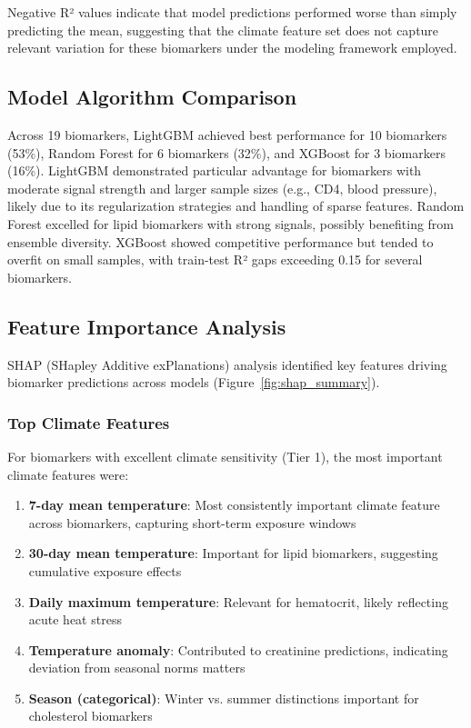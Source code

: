 Negative R² values indicate that model predictions performed worse than simply predicting the mean, suggesting that the climate feature set does not capture relevant variation for these biomarkers under the modeling framework employed.

\subsection{Model Algorithm Comparison}

Across 19 biomarkers, LightGBM achieved best performance for 10 biomarkers (53\%), Random Forest for 6 biomarkers (32\%), and XGBoost for 3 biomarkers (16\%). LightGBM demonstrated particular advantage for biomarkers with moderate signal strength and larger sample sizes (e.g., CD4, blood pressure), likely due to its regularization strategies and handling of sparse features. Random Forest excelled for lipid biomarkers with strong signals, possibly benefiting from ensemble diversity. XGBoost showed competitive performance but tended to overfit on small samples, with train-test R² gaps exceeding 0.15 for several biomarkers.

\subsection{Feature Importance Analysis}

SHAP (SHapley Additive exPlanations) analysis identified key features driving biomarker predictions across models (Figure~\ref{fig:shap_summary}).

\subsubsection{Top Climate Features}

For biomarkers with excellent climate sensitivity (Tier 1), the most important climate features were:
\begin{enumerate}
    \item \textbf{7-day mean temperature}: Most consistently important climate feature across biomarkers, capturing short-term exposure windows
    \item \textbf{30-day mean temperature}: Important for lipid biomarkers, suggesting cumulative exposure effects
    \item \textbf{Daily maximum temperature}: Relevant for hematocrit, likely reflecting acute heat stress
    \item \textbf{Temperature anomaly}: Contributed to creatinine predictions, indicating deviation from seasonal norms matters
    \item \textbf{Season (categorical)}: Winter vs. summer distinctions important for cholesterol biomarkers
\end{enumerate}

